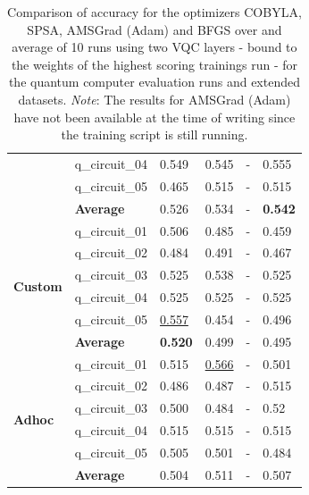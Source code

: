 \begin{table}[!h]
{\begin{tabular}{p{}p{}|p{}p{}p{}p{}}
    		                        & q\_circuit\_04 & 0.549  & 0.545 & -   & 0.555 \\
    		                        & q\_circuit\_05 & 0.465  & 0.515 & -   & 0.515 \\
    		\cline{2-6} 
    		                        & \textbf{Average} & 0.526  & 0.534 & -   & \textbf{0.542} \\
    		\hline
    		\multirow{6}{*}{\textbf{Custom}} & q\_circuit\_01 & 0.506  & 0.485 & -   & 0.459 \\
    		                        & q\_circuit\_02 & 0.484  & 0.491 & -   & 0.467 \\
    		                        & q\_circuit\_03 & 0.525  & 0.538 & -   & 0.525 \\
    		                        & q\_circuit\_04 & 0.525  & 0.525 & -  & 0.525 \\
    		                        & q\_circuit\_05 & \underline{0.557}  & 0.454 & -   & 0.496 \\
    		\cline{2-6} 
    		                        & \textbf{Average} & \textbf{0.520} & 0.499 & -   & 0.495 \\
    		\hline 
    		\multirow{6}{*}{\textbf{Adhoc}}  & q\_circuit\_01 & 0.515  & \underline{0.566} & -   & 0.501 \\
    		                        & q\_circuit\_02 & 0.486  & 0.487 & -   & 0.515 \\
    		                        & q\_circuit\_03 & 0.500  & 0.484 & -   & 0.52 \\
    		                        & q\_circuit\_04 & 0.515 & 0.515 & -   & 0.515 \\
    		                        & q\_circuit\_05 & 0.505 & 0.501 & -   & 0.484 \\
    		\cline{2-6} 
    		                        & \textbf{Average} & 0.504  & 0.511 & -  & 0.507 \\
    		\hline 
    	\end{tabular}
	}
	\caption{Comparison of accuracy for the optimizers COBYLA, SPSA, AMSGrad (Adam) and BFGS over and average of 10 runs using two VQC layers - bound to the weights of the highest scoring trainings run - for the quantum computer evaluation runs and extended datasets. \textit{Note}: The results for AMSGrad (Adam) have not been available at the time of writing since the training script is still running.}
	\label{table:accuracy_comparison_extended_dataset_and_optimizers_evaluation_runs}
\end{table}

